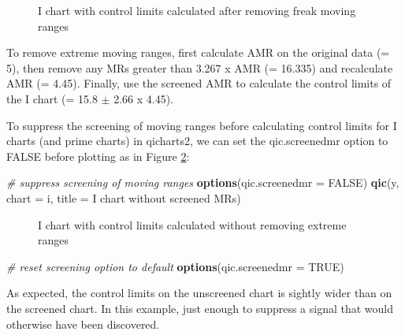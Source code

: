 \documentclass[
]{book}
\makeatletter
\newenvironment{Shaded}{\begin{snugshade}}{\end{snugshade}}
\newcommand{\AttributeTok}[1]{\textcolor[rgb]{0.13,0.29,0.53}{#1}}
\newcommand{\CommentTok}[1]{\textcolor[rgb]{0.56,0.35,0.01}{\textit{#1}}}
\newcommand{\ConstantTok}[1]{\textcolor[rgb]{0.56,0.35,0.01}{#1}}
\newcommand{\FunctionTok}[1]{\textcolor[rgb]{0.13,0.29,0.53}{\textbf{#1}}}
\newcommand{\NormalTok}[1]{#1}
\newcommand{\StringTok}[1]{\textcolor[rgb]{0.31,0.60,0.02}{#1}}
\newcommand*\pandocbounded[1]{%
  \sbox\pandoc@box{#1}%
  \Gscale@div\@tempa{\textheight}{\dimexpr\ht\pandoc@box+\dp\pandoc@box\relax}%
  \Gscale@div\@tempb{\linewidth}{\wd\pandoc@box}%
  \ifdim\@tempb\p@<\@tempa\p@\let\@tempa\@tempb\fi%
  \ifdim\@tempa\p@<\p@\scalebox{\@tempa}{\usebox\pandoc@box}%
  \else\usebox{\pandoc@box}%
  \fi%
}
\makeatother
\begin{document}
\begin{figure}
\centering
\pandocbounded{}
\caption{\label{fig:screened-mr2}I chart with control limits calculated after removing freak moving ranges}
\end{figure}

To remove extreme moving ranges, first calculate AMR on the original data (= 5), then remove any MRs greater than 3.267 x AMR (= 16.335) and recalculate AMR (= 4.45). Finally, use the screened AMR to calculate the control limits of the I chart (= 15.8 \(\pm\) 2.66 x 4.45).

To suppress the screening of moving ranges before calculating control limits for I charts (and prime charts) in qicharts2, we can set the qic.screenedmr option to FALSE before plotting as in Figure \ref{fig:screened-mr3}:

\begin{Shaded}
\begin{Highlighting}[]
\CommentTok{\# suppress screening of moving ranges}
\FunctionTok{options}\NormalTok{(}\AttributeTok{qic.screenedmr =} \ConstantTok{FALSE}\NormalTok{)}
\FunctionTok{qic}\NormalTok{(y, }
    \AttributeTok{chart =} \StringTok{\textquotesingle{}i\textquotesingle{}}\NormalTok{,}
    \AttributeTok{title =} \StringTok{\textquotesingle{}I chart without screened MRs\textquotesingle{}}\NormalTok{)}
\end{Highlighting}
\end{Shaded}

\begin{figure}
\centering
\pandocbounded{}
\caption{\label{fig:screened-mr3}I chart with control limits calculated without removing extreme ranges}
\end{figure}

\begin{Shaded}
\begin{Highlighting}[]
\CommentTok{\# reset screening option to default}
\FunctionTok{options}\NormalTok{(}\AttributeTok{qic.screenedmr =} \ConstantTok{TRUE}\NormalTok{)}
\end{Highlighting}
\end{Shaded}

As expected, the control limits on the unscreened chart is sightly wider than on the screened chart. In this example, just enough to suppress a signal that would otherwise have been discovered.
\end{document}

